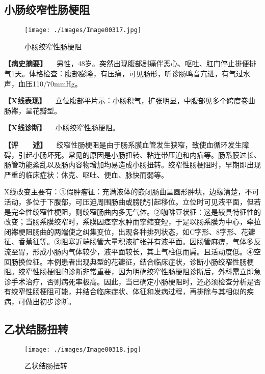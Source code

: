 \subsection{小肠绞窄性肠梗阻}

\begin{figure}[!htbp]
 \centering
 \texttt{[image: ./images/Image00317.jpg]}
 \captionsetup{justification=centering}
 \caption{小肠绞窄性肠梗阻}
 \label{fig5-7-4}
  \end{figure} 

\textbf{【病史摘要】}
　男性，48岁。突然出现腹部剧痛伴恶心、呕吐、肛门停止排便排气1天。体格检查：腹部膨隆，有压痛，可见肠形，听诊肠鸣音亢进，有气过水声，血压110/70mmHg。

\textbf{【X线表现】}
　立位腹部平片示：小肠积气，扩张明显，中腹部见多个跨度卷曲肠襻，呈花瓣型。

\textbf{【X线诊断】} 　小肠绞窄性肠梗阻。

\textbf{【评　　述】}
　绞窄性肠梗阻是由于肠系膜血管发生狭窄，致使血循环发生障碍，引起小肠坏死。常见的原因是小肠扭转、粘连带压迫和内疝等。肠系膜过长、肠管功能紊乱以及肠内容物增加均易造成小肠扭转。绞窄性肠梗阻时，早期即出现严重的临床症状：休克、呕吐、便血、脉快而弱等。

X线改变主要有：①假肿瘤征：充满液体的嵌闭肠曲呈圆形肿块，边缘清楚，不可活动，多位于下腹部，可压迫周围肠曲或膀胱引起移位。立位时可见液平面，但若是完全性绞窄性梗阻，则绞窄肠曲内多无气体。②咖啡豆状征：这是较具特征性的改变；当肠系膜绞窄时，系膜因痉挛水肿而挛缩变短，于是以肠系膜为中心，牵拉闭襻梗阻肠曲的两端使之纠集变位，出现各种排列状态，如C字形、8字形、花瓣征、香蕉征等。③阻塞近端肠管大量积液扩张并有液平面。因肠管麻痹，气体多反流至胃，形成小肠内气体较少，液平面较长，其上气柱低而扁。且活动度低。④空回肠换位征。本例患者出现典型的花瓣征，结合临床症状，诊断小肠绞窄性肠梗阻。绞窄性肠梗阻的诊断非常重要，因为明确绞窄性肠梗阻诊断后，外科需立即急诊手术治疗，否则病死率极高。因此，当已确定小肠梗阻时，还必须检查分析是否有绞窄性肠梗阻可能，并结合临床症状、体征和发病过程，再排除与其相似的疾病，可做出初步诊断。

\subsection{乙状结肠扭转}

\begin{figure}[!htbp]
 \centering
 \texttt{[image: ./images/Image00318.jpg]}
 \captionsetup{justification=centering}
 \caption{乙状结肠扭转}
 \label{fig5-7-5}
  \end{figure} 

